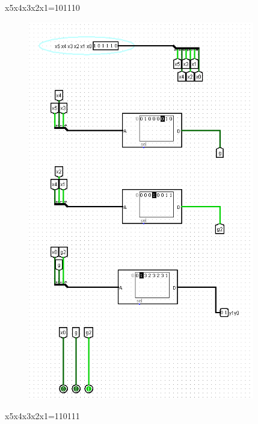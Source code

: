 \documentclass[]{article}
\begin{document}
x5x4x3x2x1=101110
\begin{figure}[H]
	\centering
	\includegraphics[width=0.88\textwidth]{test3_101110.png}
\end{figure}
x5x4x3x2x1=110111
\end{document}
